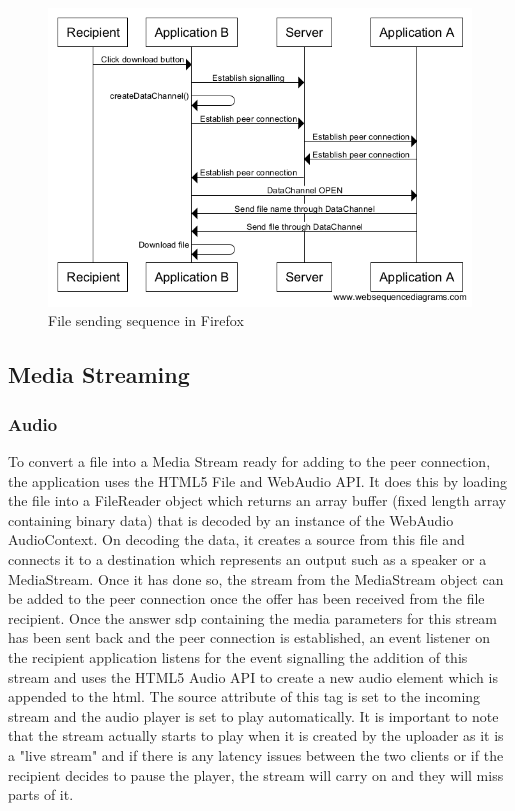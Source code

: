 \documentclass[]{report}
\begin{document}
			\begin{figure}[H]
				\caption{File sending sequence in Firefox}
				\centering
				\includegraphics[scale=0.5]{file-sending-sequence-firefox.png}
			\end{figure}	
			
			\subsection{Media Streaming}
				\subsubsection{Audio}
				To convert a file into a Media Stream ready for adding to the peer connection, the application uses the HTML5 File and WebAudio API. It does this by loading the file into a FileReader object which returns an array buffer (fixed length array containing binary data) that is decoded by an instance of the WebAudio AudioContext. On decoding the data, it creates a source from this file and connects it to a destination which represents an output such as a speaker or a MediaStream. Once it has done so, the stream from the MediaStream object can be added to the peer connection once the offer has been received from the file recipient. Once the answer sdp containing the media parameters for this stream has been sent back and the peer connection is established, an event listener on the recipient application listens for the event signalling the addition of this stream and uses the HTML5 Audio API to create a new audio element which is appended to the html. The source attribute of this tag is set to the incoming stream and the audio player is set to play automatically. It is important to note that the stream actually starts to play when it is created by the uploader as it is a "live stream" and if there is any latency issues between the two clients or if the recipient decides to pause the player, the stream will carry on and they will miss parts of it. 
				
\end{document}
